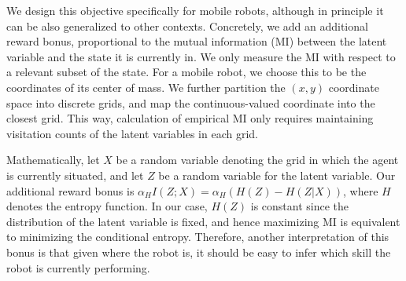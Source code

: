 \documentclass{article} %
\begin{document}
We design this objective specifically for mobile robots, although in principle it can be also generalized to other contexts.
Concretely, we add an additional reward bonus, proportional to the mutual information (MI) between the latent variable and the state it is currently in. We only measure the MI with respect to a relevant subset of the state.
For a mobile robot, we choose this to be the coordinates of its center of mass. We further partition the $(x,y)$ coordinate space into discrete grids, and map the continuous-valued coordinate into the closest grid. This way, calculation of empirical MI only requires maintaining visitation counts of the latent variables in each grid.

Mathematically, let $X$ be a random variable denoting the grid in which the agent is currently situated, and let $Z$ be a random variable for the latent variable. Our additional reward bonus is $\alpha_H I(Z;X) = \alpha_H (H(Z) - H(Z|X))$, where $H$ denotes the entropy function. In our case, $H(Z)$ is constant since the distribution of the latent variable is fixed, and hence maximizing MI is equivalent to minimizing the conditional entropy. Therefore, another interpretation of this bonus is that given where the robot is, it should be easy to infer  which
skill the robot is currently performing. 




\end{document}
